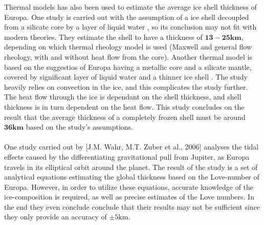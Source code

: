 Thermal models has also been used to estimate the average ice shell thickness of Europa. One study is carried out with the assumption of a ice shell decoupled from a silicate core by a layer of liquid water \cite{ThermThick}, so its conclusion may not fit with modern theories. They estimate the shell to have a thickness of $\mathbf{13-25km}$, depending on which thermal rheology model is used (Maxwell and general flow rheology, with and without heat flow from the core). Another thermal model is based on the suggestios of Europa having a metallic core and a silicate mantle, covered by significant layer of liquid water and a thinner ice shell \cite{ThermThick2}. The study heavily relies on convection in the ice, and this complicates the study further. The heat flow through the ice is dependant on the shell thickness, and shell thickness is in turn dependent on the heat flow. This study concludes on the result that the average thickness of a completely frozen shell must be around $\mathbf{36km}$ based on the study's assumptions.
\\
\\ One study carried out by [J.M. Wahr, M.T. Zuber et al., 2006] analyses the tidal effects caused by the differentiating gravitational pull from Jupiter, as Europa travels in its elliptical orbit around the planet. The result of the study is a set of analytical equations estimating the global thickness based on the Love-number of Europa. However, in order to utilize these equations, accurate knowledge of the ice-composition is required, as well as precise estimates of the Love numbers. In the end they even conclude conclude that their results may not be sufficient since they only provide an accuracy of $\pm 5\mathrm{km}$.
